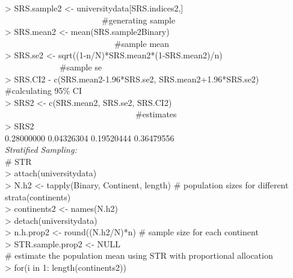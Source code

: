 \documentclass{article}
\begin{document}
\textgreater\hspace{1mm} SRS.sample2 \textless- universitydata[SRS.indices2,] ~~~~~~~~~~~~~~~~~~~~~~~\#generating sample\\
\textgreater\hspace{1mm} SRS.mean2 \textless- mean(SRS.sample2\textdollar Binary) ~~~~~~~~~~~~~~~~~~~~~~~~~~\#sample mean\\
\textgreater\hspace{1mm} SRS.se2 \textless- sqrt((1-n/N)*SRS.mean2*(1-SRS.mean2)/n) ~~~~~~~~~~~~~\#sample se\\
\textgreater\hspace{1mm} SRS.CI2 \txetless- c(SRS.mean2-1.96*SRS.se2, SRS.mean2+1.96*SRS.se2) \#calculating 95\% CI\\
\textgreater\hspace{1mm} SRS2 \textless- c(SRS.mean2, SRS.se2, SRS.CI2) ~~~~~~~~~~~~~~~~~~~~~~~~~~~~~~~\#estimates\\
\textgreater\hspace{1mm} SRS2\\
\hspace{1mm} 0.28000000 0.04326304 0.19520444 0.36479556\\
\noindent\textit{Stratified Sampling:}\\
\# STR\\
\textgreater\hspace{1mm} attach(universitydata)\\
\textgreater\hspace{1mm} N.h2 \textless- tapply(Binary, Continent, length) \# population sizes for different strata(continents)\\
\textgreater\hspace{1mm} continents2 \textless- names(N.h2)\\
\textgreater\hspace{1mm} detach(universitydata)\\
\textgreater\hspace{1mm} n.h.prop2 \textless- round((N.h2/N)*n) \# sample size for each continent\\
\textgreater\hspace{1mm} STR.sample.prop2 \textless- NULL\\
\hspace{1mm} \# estimate the population mean using STR with proportional allocation\\
\textgreater\hspace{1mm} for(i in 1: length(continents2))\\
\end{document}
